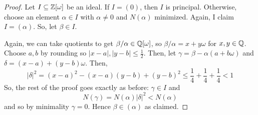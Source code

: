 \begin{proof}
    Let $I \subseteq \mathbb{Z}[\omega]$ be an ideal. If $I=(0)$, then $I$ is principal. Otherwise, choose an element $\alpha \in I$ with $\alpha \neq 0$ and $N(\alpha)$ minimized. Again, I claim $I = (\alpha)$. So, let $\beta \in I$.

    Again, we can take quotients to get $\beta/\alpha \in \mathbb{Q}[\omega]$, so $\beta/\alpha = x+y\omega$ for $x,y \in \mathbb{Q}$. Choose $a,b$ by rounding so $|x-a|,|y-b| \leq \frac12$. Then, let $\gamma = \beta-\alpha(a+b\omega)$ and $\delta = (x-a)+(y-b)\omega$. Then,
    \[ |\delta|^2 = (x-a)^2-(x-a)(y-b)+(y-b)^2 \leq \frac14+\frac14+\frac14 < 1 \]
    So, the rest of the proof goes exactly as before: $\gamma \in I$ and
    \[ N(\gamma) = N(\alpha)|\delta|^2 < N(\alpha) \]
    and so by minimality $\gamma = 0$. Hence $\beta \in (\alpha)$ as claimed.
\end{proof}